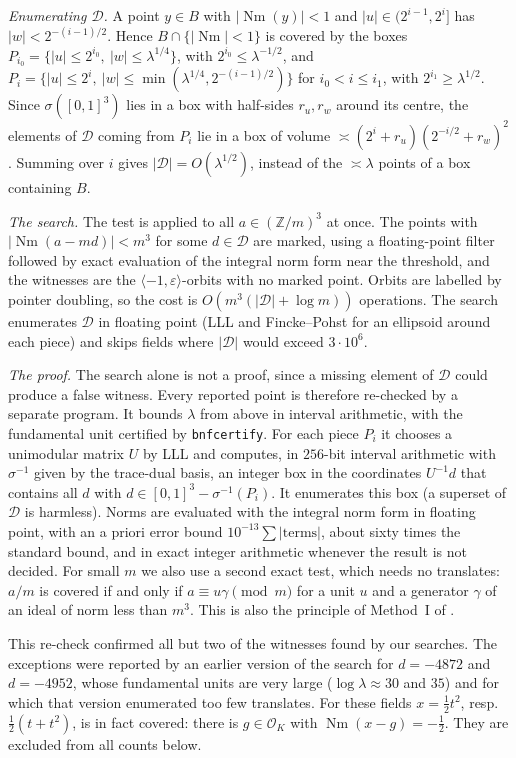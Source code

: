 \documentclass[11pt]{amsart}
\theoremstyle{definition}
\theoremstyle{remark}
\numberwithin{equation}{section}
\newcommand{\Z}{\mathbb{Z}}
\newcommand{\cO}{\mathcal{O}}
\newcommand{\Nm}{\operatorname{Nm}}
\begin{document}
\emph{Enumerating $\mathcal D$.} A point $y\in B$ with $|\Nm(y)|<1$ and $|u|\in(2^{i-1},2^i]$
has $|w|<2^{-(i-1)/2}$. Hence $B\cap\{|\Nm|<1\}$ is covered by the boxes
$P_{i_0}=\{|u|\le2^{i_0},\ |w|\le\lambda^{1/4}\}$, with $2^{i_0}\le\lambda^{-1/2}$, and
$P_i=\{|u|\le2^i,\ |w|\le\min(\lambda^{1/4},2^{-(i-1)/2})\}$ for $i_0<i\le i_1$, with
$2^{i_1}\ge\lambda^{1/2}$. Since $\sigma([0,1]^3)$ lies in a box with half-sides $r_u,r_w$ around
its centre, the elements of $\mathcal D$ coming from $P_i$ lie in a box of volume
$\asymp(2^i+r_u)(2^{-i/2}+r_w)^2$. Summing over $i$ gives $|\mathcal D|=O(\lambda^{1/2})$, instead
of the $\asymp\lambda$ points of a box containing $B$.

\emph{The search.} The test is applied to all $a\in(\Z/m)^3$ at once. The points with
$|\Nm(a-md)|<m^3$ for some $d\in\mathcal D$ are marked, using a floating-point filter followed by
exact evaluation of the integral norm form near the threshold, and the witnesses are the
$\langle-1,\varepsilon\rangle$-orbits with no marked point. Orbits are labelled by pointer
doubling, so the cost is $O(m^3(|\mathcal D|+\log m))$ operations. The search enumerates
$\mathcal D$ in floating point (LLL and Fincke--Pohst for an ellipsoid around each piece) and
skips fields where $|\mathcal D|$ would exceed $3\cdot10^6$.

\emph{The proof.} The search alone is not a proof, since a missing element of $\mathcal D$
could produce a false witness. Every reported point is therefore re-checked by a separate
program. It bounds $\lambda$ from above in interval arithmetic, with the fundamental unit
certified by \texttt{bnfcertify}. For each piece $P_i$ it chooses a unimodular matrix $U$ by LLL
and computes, in $256$-bit interval arithmetic with $\sigma^{-1}$ given by the trace-dual basis,
an integer box in the coordinates $U^{-1}d$ that contains all $d$ with
$d\in[0,1]^3-\sigma^{-1}(P_i)$. It enumerates this box (a superset of $\mathcal D$ is harmless).
Norms are evaluated with the integral norm form in floating point, with an a priori error bound
$10^{-13}\sum|\text{terms}|$, about sixty times the standard bound, and in exact integer
arithmetic whenever the result is not decided. For small $m$ we also use a second exact test,
which needs no translates: $a/m$ is covered if and only if $a\equiv u\gamma\pmod m$ for a unit
$u$ and a generator $\gamma$ of an ideal of norm less than $m^3$. This is also the principle of
Method~I of \cite{BBT}.

This re-check confirmed all but two of the witnesses found by our searches. The exceptions were
reported by an earlier version of the search for $d=-4872$ and $d=-4952$, whose fundamental
units are very large ($\log\lambda\approx30$ and $35$) and for which that version enumerated
too few translates. For these fields $x=\tfrac12t^2$, resp.\ $\tfrac12(t+t^2)$, is in fact
covered: there is $g\in\cO_K$ with $\Nm(x-g)=-\frac12$. They are excluded from all counts
below.
\end{document}
